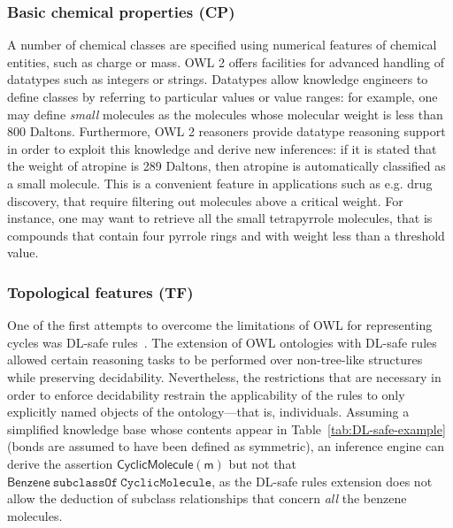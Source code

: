 \documentclass[10pt]{bmc_article}
\newenvironment{bmcformat}{\baselineskip20pt\sloppy\setboolean{publ}{false}}{\baselineskip20pt\sloppy}
\begin{document}
\begin{bmcformat}
\subsubsection*{Basic chemical properties (CP)}

A number of chemical classes are specified using numerical features of chemical entities, such as charge or mass. OWL 2
offers facilities for advanced handling of datatypes such as integers or strings. Datatypes allow knowledge engineers to define classes by referring to particular values or value ranges: for example, one may define \emph{small} molecules as the molecules whose molecular weight is less than 800 Daltons. 
Furthermore, OWL 2 reasoners provide datatype reasoning support~\cite{Motik2008} in order to exploit this knowledge and derive new inferences: if it is stated that the weight of atropine is 289 Daltons, then atropine is automatically classified as a small molecule. 
This is a convenient feature in applications such as e.g. drug discovery, that require filtering out molecules above a critical weight. For instance, one may want to retrieve all the small tetrapyrrole molecules, that is compounds that contain four pyrrole rings and with weight less than a threshold value.%

\subsubsection*{Topological features (TF)}
\label{subsubsec:cycles}

One of the first attempts to overcome the limitations of OWL for representing cycles was DL-safe rules~\cite{DLSafeBoris}. The extension of OWL ontologies with DL-safe rules allowed certain reasoning tasks to be performed over non-tree-like structures while preserving decidability. Nevertheless, the restrictions that are necessary in order to enforce decidability restrain the applicability of the rules to only explicitly named objects of the ontology---that is, individuals. Assuming a simplified knowledge base whose contents appear in Table~\ref{tab:DL-safe-example} (bonds are assumed to have been defined as symmetric), %
an inference engine can derive the assertion $\mathsf{CyclicMolecule(m)}$ but not that $\mathsf{Benzene} ~\texttt{subclassOf} ~\texttt{CyclicMolecule}$, as the DL-safe rules extension does not allow the deduction of subclass relationships that concern \emph{all} the benzene molecules. 


\end{bmcformat}
\end{document}
